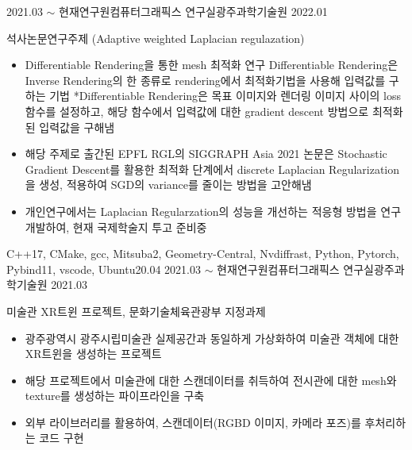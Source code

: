 %
%
%
\begin{experiences}
  \experience
    {2021.03 $\sim$ 현재}{연구원}{컴퓨터그래픽스 연구실}{광주과학기술원}    
    {2022.01} {석사논문연구주제 (Adaptive weighted Laplacian regulazation)
                \begin{itemize}
                  \setlength\itemsep{0.5em}
                  \item Differentiable Rendering을 통한 mesh 최적화 연구
                  \newline *Differentiable Rendering은 Inverse Rendering의 한 종류로 rendering에서 최적화기법을 사용해 입력값를 구하는 기법
                  \newline **Differentiable Rendering은 목표 이미지와 렌더링 이미지 사이의 loss 함수를 설정하고, 해당 함수에서 입력값에 대한 gradient descent 방법으로 최적화된 입력값을 구해냄
                  \item 해당 주제로 출간된 EPFL RGL의 SIGGRAPH Asia 2021 논문은 Stochastic Gradient Descent를 활용한 최적화 단계에서 discrete Laplacian Regularization을 생성, 적용하여 SGD의 variance를 줄이는 방법을 고안해냄
                  \item 개인연구에서는 Laplacian Regularzation의 성능을 개선하는 적응형 방법을 연구개발하여, 현재 국제학술지 투고 준비중
                \end{itemize}
                }{C++17, CMake, gcc, Mitsuba2, Geometry-Central, Nvdiffrast, Python, Pytorch, Pybind11, vscode, Ubuntu20.04}
  \emptySeparator
  \experience
    {2021.03 $\sim$ 현재}{연구원}{컴퓨터그래픽스 연구실}{광주과학기술원}
    {2021.03} {미술관 XR트윈 프로젝트, 문화기술체육관광부 지정과제
                \begin{itemize}
                  \setlength\itemsep{0.5em}
                  \item 광주광역시 광주시립미술관 실제공간과 동일하게 가상화하여 미술관 객체에 대한 XR트윈을 생성하는 프로젝트
                  \item 해당 프로젝트에서 미술관에 대한 스캔데이터를 취득하여 전시관에 대한 mesh와 texture를 생성하는 파이프라인을 구축
                  \item 외부 라이브러리를 활용하여, 스캔데이터(RGBD 이미지, 카메라 포즈)를 후처리하는 코드 구현

\end{itemize}}
\end{experiences}
